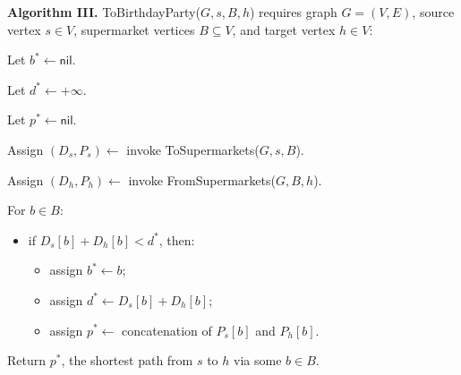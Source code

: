 \begin{enumerate}
\begin{solution}
\textbf{Algorithm III. }{\sc ToBirthdayParty}($G,s,B,h$) requires graph $G=(V,E)$, source vertex $s\in V$, supermarket vertices $B\subseteq V$, and target vertex $h\in V$:

Let $b^*\leftarrow\mathsf{nil}$.

Let $d^*\leftarrow+\infty$.

Let $p^*\leftarrow\mathsf{nil}$.

Assign $(D_s,P_s)\leftarrow $ invoke {\sc ToSupermarkets}($G,s,B$).

Assign $(D_h,P_h)\leftarrow $ invoke {\sc FromSupermarkets}($G,B,h$).

For $b\in B$:
\begin{itemize}
\item if $D_s[b]+D_h[b]<d^*$, then:
\begin{itemize}
\item assign $b^*\leftarrow b$;
\item assign $d^*\leftarrow D_s[b]+D_h[b]$;
\item assign $p^*\leftarrow $ concatenation of $P_s[b]$ and $P_h[b]$.
\end{itemize}
\end{itemize}
Return $p^*$, the shortest path from $s$ to $h$ via some $b\in B$.
\end{solution}
\end{enumerate}
\newpage
